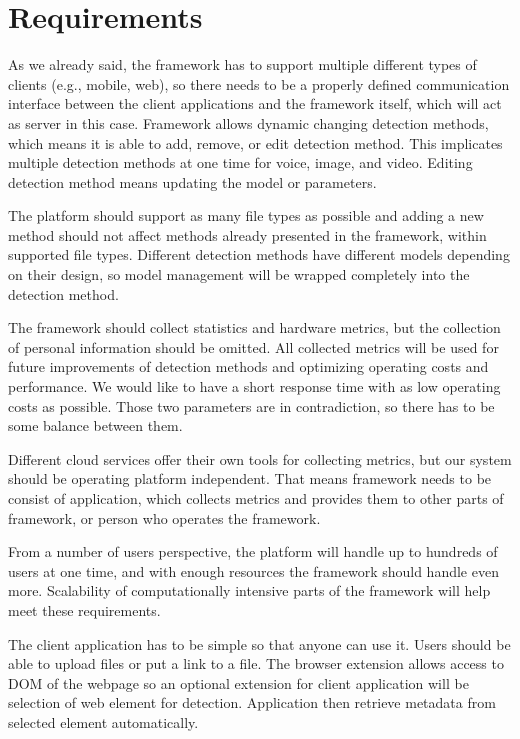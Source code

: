 \section{Requirements}

As we already said, the framework has to support multiple different types of clients (e.g., mobile, web), so there needs to be a properly defined communication interface between the client applications and the framework itself, which will act as server in this case. Framework allows dynamic changing detection methods, which means it is able to add, remove, or edit detection method. This implicates multiple detection methods at one time for voice, image, and video. Editing detection method means updating the model or parameters. 

The platform should support as many file types as possible and adding a new method should not affect methods already presented in the framework, within supported file types. Different detection methods have different models depending on their design, so model management will be wrapped completely into the detection method.

The framework should collect statistics and hardware metrics, but the collection of personal information should be omitted. All collected metrics will be used for future improvements of detection methods and optimizing operating costs and performance. We would like to have a short response time with as low operating costs as possible. Those two parameters are in contradiction, so there has to be some balance between them. 

Different cloud services offer their own tools for collecting metrics, but our system should be operating platform independent. That means framework needs to be consist of application, which collects metrics and provides them to other parts of framework, or person who operates the framework.

From a number of users perspective, the platform will handle up to hundreds of users at one time, and with enough resources the framework should handle even more. Scalability of computationally intensive parts of the framework will help meet these requirements. 

The client application has to be simple so that anyone can use it. Users should be able to upload files or put a link to a file. The browser extension allows access to DOM of the webpage so an optional extension for client application will be selection of web element for detection. Application then retrieve metadata from selected element automatically. 

